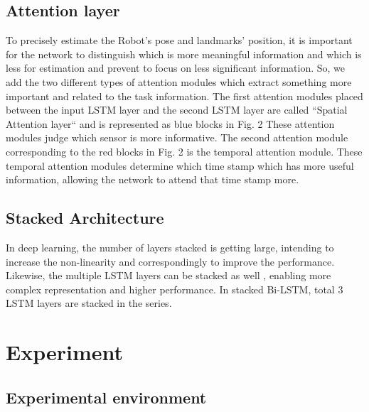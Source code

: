 \documentclass[letterpaper, 10 pt, conference]{ieeeconf}  %
\begin{document}
\subsection{Attention layer}

To precisely estimate the Robot’s pose and landmarks’ position, it is important for the network to distinguish which is more meaningful information and which is less for estimation and prevent to focus on less significant information. So, we add the two different types of attention modules \cite{luong2015effective} which extract something more important and related to the task information. The first attention modules placed between the input LSTM layer and the second LSTM layer are called “Spatial Attention layer“ and is represented as blue blocks in Fig. 2 These attention modules judge which sensor is more informative. The second attention module corresponding to the red blocks in Fig. 2 is the temporal attention module. These temporal attention modules determine which time stamp which has more useful information, allowing the network to attend that time stamp more.  

\subsection{Stacked Architecture}

In deep learning, the number of layers stacked is getting large, intending to increase the non-linearity and correspondingly to improve the performance. Likewise, the multiple LSTM layers can be stacked as well \cite{dyer2015transition}, enabling more complex representation and higher performance. In stacked Bi-LSTM, total 3 LSTM layers are stacked in the series. 


\section{Experiment}


\subsection{Experimental environment} 
\end{document}
